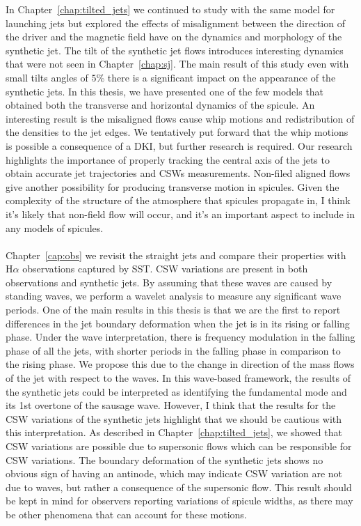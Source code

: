 \documentclass[12pt]{ociamthesis}
\newcommand{\np}{\\ \\}
\begin{document}
In Chapter~\ref{chap:tilted_jets} we continued to study with the same model for launching jets but explored the effects of misalignment between the direction of the driver and the magnetic field have on the dynamics and morphology of the synthetic jet. The tilt of the synthetic jet flows introduces interesting dynamics that were not seen in Chapter~\ref{chap:sj}. The main result of this study even with small tilts angles of $5\%$ there is a significant impact on the appearance of the synthetic jets. In this thesis, we have presented one of the few models that obtained both the transverse and horizontal dynamics of the spicule. An interesting result is the misaligned flows cause whip motions and redistribution of the densities to the jet edges. We tentatively put forward that the whip motions is possible a consequence of a DKI, but further research is required. Our research highlights the importance of properly tracking the central axis of the jets to obtain accurate jet trajectories and CSWs measurements. Non-filed aligned flows give another possibility for producing transverse motion in spicules. Given the complexity of the structure of the atmosphere that spicules propagate in, I think it's likely that non-field flow will occur, and it's an important aspect to include in any models of spicules. \np
%
Chapter~\ref{cap:obs} we revisit the straight jets and compare their properties with H$\alpha$ observations captured by SST. CSW variations are present in both observations and synthetic jets. By assuming that these waves are caused by standing waves, we perform a wavelet analysis to measure any significant wave periods. One of the main results in this thesis is that we are the first to report differences in the jet boundary deformation when the jet is in its rising or falling phase. Under the wave interpretation, there is frequency modulation in the falling phase of all the jets, with shorter periods in the falling phase in comparison to the rising phase. We propose this due to the change in direction of the mass flows of the jet with respect to the waves. In this wave-based framework, the results of the synthetic jets could be interpreted as identifying the fundamental mode and its 1st overtone of the sausage wave. However, I think that the results for the CSW variations of the synthetic jets highlight that we should be cautious with this interpretation. As described in Chapter~\ref{chap:tilted_jets}, we showed that CSW variations are possible due to supersonic flows which can be responsible for CSW variations. The boundary deformation of the synthetic jets shows no obvious sign of having an antinode, which may indicate CSW variation are not due to waves, but rather a consequence of the supersonic flow. This result should be kept in mind for observers reporting variations of spicule widths, as there may be other phenomena that can account for these motions. \np
\end{document}
